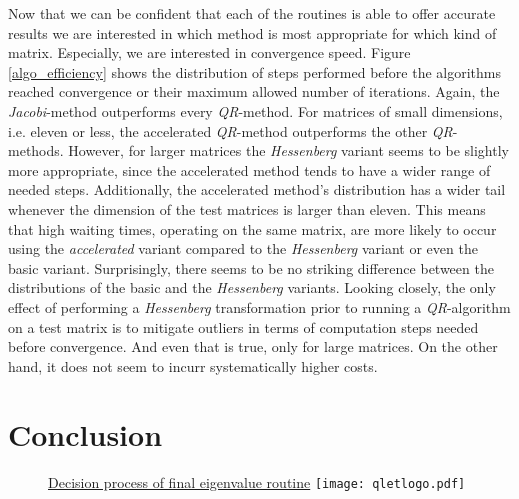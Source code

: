 \documentclass[12pt]{article}
\begin{document}
Now that we can be confident that each of the routines is able to offer accurate results we are interested in which method is most appropriate for which kind of matrix. Especially, we are interested in convergence speed. Figure \ref{algo_efficiency} shows the distribution of steps performed before the algorithms reached convergence or their maximum allowed number of iterations. Again, the \textit{Jacobi}-method outperforms every \textit{QR}-method. For matrices of small dimensions, i.e. eleven or less, the accelerated \textit{QR}-method outperforms the other \textit{QR}-methods. However, for larger matrices the \textit{Hessenberg} variant seems to be slightly more appropriate, since the accelerated method tends to have a wider range of needed steps. Additionally, the accelerated method's distribution has a wider tail whenever the dimension of the test matrices is larger than eleven. This means that high waiting times, operating on the same matrix, are more likely to occur using the \textit{accelerated} variant compared to the \textit{Hessenberg} variant or even the basic variant. Surprisingly, there seems to be no striking difference between the distributions of the basic and the \textit{Hessenberg} variants. Looking closely, the only effect of performing a \textit{Hessenberg} transformation prior to running a \textit{QR}-algorithm on a test matrix is to mitigate outliers in terms of computation steps needed before convergence. And even that is true, only for large matrices. On the other hand, it does not seem to incurr systematically higher costs.  

\section{Conclusion}
\begin{figure}
\centering
\caption{\href {https://github.com/thsis/NIS18/tree/master/algorithms/eigen.py}{Decision process of final eigenvalue routine}  \protect\texttt{[image: qletlogo.pdf]}}
\end{figure}
\end{document}
